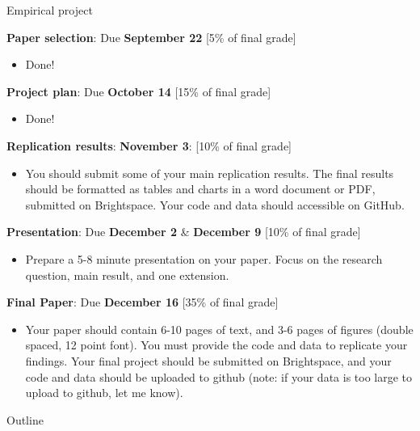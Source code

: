 \documentclass[compress, 8pt]{beamer}
\begin{document}
\begin{frame}{Empirical project}

\textbf{Paper selection}: Due \textbf{September 22} [5\% of final grade]
\begin{itemize}
\item Done! 
\end{itemize}

\textbf{Project plan}: Due \textbf{October 14} [15\% of final grade] 
\begin{itemize}
\item Done!
\end{itemize} 

\textbf{Replication results}: \textbf{November 3}: [10\% of final grade]
\begin{itemize}
\item You should submit some of your main replication results. The final results should be formatted as tables and charts in a word document or PDF, submitted on Brightspace. Your code and data should accessible on GitHub.
\end{itemize}

\textbf{Presentation}: Due \textbf{December 2} \& \textbf{December 9} [10\% of final grade]
\begin{itemize}
\item Prepare a 5-8 minute presentation on your paper. Focus on the research question, main result, and one extension. 
\end{itemize}

\textbf{Final Paper}: Due \textbf{December 16} [35\% of final grade]
\begin{itemize}
\item Your paper should contain 6-10 pages of text, and 3-6 pages of figures (double spaced, 12 point font).
You must provide the code and data to replicate your findings. 
Your final project should be submitted on Brightspace, and your code and data should be uploaded to github (note: if your data is too large to upload to github, let me know). 
\end{itemize}

\end{frame}



\miniframesoff
\begin{frame}{Outline}
    \tableofcontents
\end{frame}
\miniframeson
\end{document}
